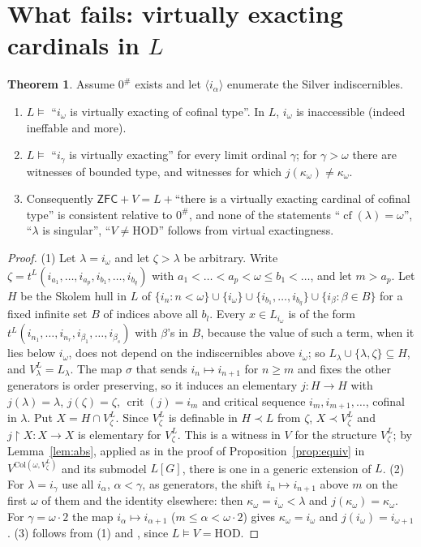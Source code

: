 \documentclass[11pt,letterpaper]{article}
\theoremstyle{definition}
\newtheorem{theorem}[definition]{Theorem}
\numberwithin{equation}{section}
\newcommand{\ZFC}{\mathsf{ZFC}}
\newcommand{\HOD}{\mathrm{HOD}}
\newcommand{\crit}{\operatorname{crit}}
\newcommand{\cf}{\operatorname{cf}}
\newcommand{\restr}{\mathbin{\upharpoonright}}
\begin{document}
\section{What fails: virtually exacting cardinals in $L$}

\begin{theorem}\label{thm:sharp}
Assume $0^\#$ exists and let $\langle i_\alpha\rangle$ enumerate the Silver indiscernibles.
\begin{enumerate}
\item $L\models$ ``$i_\omega$ is virtually exacting of cofinal type''. In $L$, $i_\omega$ is inaccessible (indeed ineffable and more).
\item $L\models$ ``$i_\gamma$ is virtually exacting'' for every limit ordinal $\gamma$; for $\gamma>\omega$ there are witnesses of bounded type, and witnesses for which $j(\kappa_\omega)\ne\kappa_\omega$.
\item Consequently $\ZFC+V=L+{}$``there is a virtually exacting cardinal of cofinal type'' is consistent relative to $0^\#$, and none of the statements ``$\cf(\lambda)=\omega$'', ``$\lambda$ is singular'', ``$V\ne\HOD$'' follows from virtual exactingness.
\end{enumerate}
\end{theorem}

\begin{proof}
(1) Let $\lambda=i_\omega$ and let $\zeta>\lambda$ be arbitrary. Write $\zeta=t^L(i_{a_1},\dots,i_{a_p},i_{b_1},\dots,i_{b_q})$ with $a_1<\dots<a_p<\omega\le b_1<\dots$, and let $m>a_p$. Let $H$ be the Skolem hull in $L$ of $\{i_n:n<\omega\}\cup\{i_\omega\}\cup\{i_{b_1},\dots,i_{b_q}\}\cup\{i_\beta:\beta\in B\}$ for a fixed infinite set $B$ of indices above all $b_l$. Every $x\in L_{i_\omega}$ is of the form $t^L(i_{n_1},\dots,i_{n_r},i_{\beta_1},\dots,i_{\beta_s})$ with $\beta$'s in $B$, because the value of such a term, when it lies below $i_\omega$, does not depend on the indiscernibles above $i_\omega$; so $L_\lambda\cup\{\lambda,\zeta\}\subseteq H$, and $V^L_\lambda=L_\lambda$. The map $\sigma$ that sends $i_n\mapsto i_{n+1}$ for $n\ge m$ and fixes the other generators is order preserving, so it induces an elementary $j:H\to H$ with $j(\lambda)=\lambda$, $j(\zeta)=\zeta$, $\crit(j)=i_m$ and critical sequence $i_m,i_{m+1},\dots$, cofinal in $\lambda$. Put $X=H\cap V^L_\zeta$. Since $V^L_\zeta$ is definable in $H\prec L$ from $\zeta$, $X\prec V^L_\zeta$ and $j\restr X:X\to X$ is elementary for $V^L_\zeta$. This is a witness in $V$ for the structure $V^L_\zeta$; by Lemma~\ref{lem:abs}, applied as in the proof of Proposition~\ref{prop:equiv} in $V^{\mathrm{Col}(\omega,V^L_\zeta)}$ and its submodel $L[G]$, there is one in a generic extension of $L$.
(2) For $\lambda=i_\gamma$ use all $i_\alpha$, $\alpha<\gamma$, as generators, the shift $i_n\mapsto i_{n+1}$ above $m$ on the first $\omega$ of them and the identity elsewhere: then $\kappa_\omega=i_\omega<\lambda$ and $j(\kappa_\omega)=\kappa_\omega$. For $\gamma=\omega\cdot2$ the map $i_\alpha\mapsto i_{\alpha+1}$ ($m\le\alpha<\omega\cdot2$) gives $\kappa_\omega=i_\omega$ and $j(i_\omega)=i_{\omega+1}$.
(3) follows from (1) and \cite[Thm.~2.10]{abl}, since $L\models V=\HOD$.
\end{proof}
\end{document}
